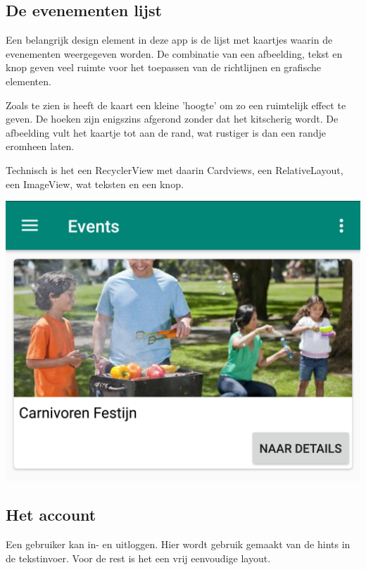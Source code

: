 \documentclass[dutch]{report}
\begin{document}
	\subsection{De evenementen lijst}
	\begin{minipage}{0.60\textwidth}
	Een belangrijk design element in deze app is de lijst met kaartjes waarin de evenementen weergegeven
	worden. De combinatie van een afbeelding, tekst en knop geven veel ruimte voor het toepassen van de 
	richtlijnen en grafische elementen. 
	
	Zoals te zien is heeft de kaart een kleine 'hoogte' om zo een ruimtelijk effect te geven. De hoeken 
	zijn enigszins afgerond zonder dat het kitscherig wordt. De afbeelding vult het kaartje tot aan de 
	rand, wat rustiger is dan een randje eromheen laten. 
	
	Technisch is het een RecyclerView met daarin Cardviews, een RelativeLayout, een ImageView, wat 
	teksten en een knop.
	
	\end{minipage}
	\hfill
	\begin{minipage}{0.35\textwidth}
	\includegraphics[width=\linewidth]{images/cardlist.png}
	\end{minipage}
	
	\subsection{Het account}
	Een gebruiker kan in- en uitloggen. Hier wordt gebruik gemaakt van de hints in de tekstinvoer. Voor 
	de rest is het een vrij eenvoudige layout. 
	
\end{document}
